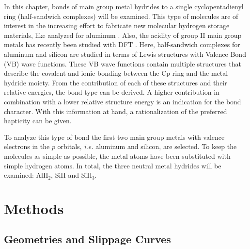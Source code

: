 In this chapter, bonds of main group metal hydrides to a single cyclopentadienyl ring (half-sandwich complexes) will be examined. This type of molecules are of interest in the increasing effort to fabricate new molecular hydrogen storage materials, like analyzed for aluminum \cite{himmel}. Also, the acidity of group II main group metals has recently been studied with DFT \cite{hurtado}. Here, half-sandwich complexes for aluminum and silicon are studied in terms of Lewis structures with Valence Bond (VB) wave functions. These VB wave functions contain multiple structures that describe the covalent and ionic bonding between the Cp-ring and the metal hydride moiety. From the contribution of each of these structures and their relative energies, the bond type can be derived. A higher contribution in combination with a lower relative structure energy is an indication for the bond character. With this information at hand, a rationalization of the preferred hapticity can be given. 

To analyze this type of bond the first two main group metals with valence electrons in the $p$ orbitals, \textit{i.e.} aluminum and silicon, are selected. To keep the molecules as simple as possible, the metal atoms have been substituted with simple hydrogen atoms. In total, the three neutral metal hydrides will be examined: AlH$_2$, SiH and SiH$_3$.

\section{Methods}

\subsection{\label{ch4.sec.geom}Geometries and Slippage Curves}

